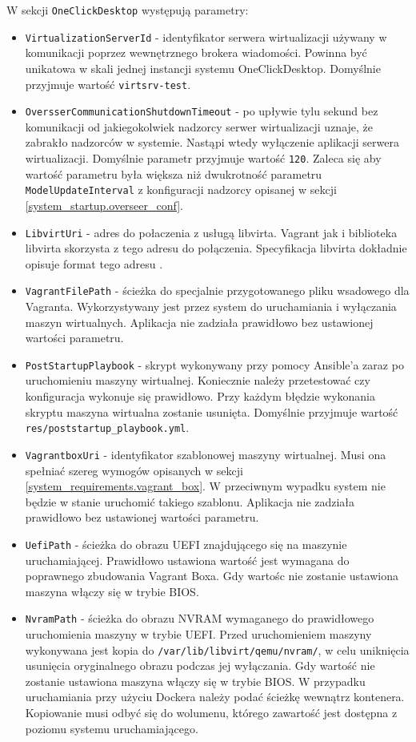 \documentclass[../opis-rozwiazania.tex]{subfiles}
\begin{document}
W sekcji \texttt{OneClickDesktop} występują parametry:
\begin{itemize}
  \item \texttt{VirtualizationServerId} - identyfikator serwera wirtualizacji używany w komunikacji poprzez wewnętrznego brokera wiadomości. Powinna być unikatowa w skali jednej instancji systemu OneClickDesktop. Domyślnie przyjmuje wartość \texttt{virtsrv-test}.
  \item \texttt{OversserCommunicationShutdownTimeout} - po upływie tylu sekund bez komunikacji od jakiegokolwiek nadzorcy serwer wirtualizacji uznaje, że zabrakło nadzorców w systemie. Nastąpi wtedy wyłączenie aplikacji serwera wirtualizacji. Domyślnie parametr przyjmuje wartość \texttt{120}. Zaleca się aby wartość parametru była większa niż dwukrotność parametru \texttt{ModelUpdateInterval} z konfiguracji nadzorcy opisanej w sekcji \ref{system_startup.overseer_conf}.
  \item \texttt{LibvirtUri} - adres do połaczenia z usługą libvirta. Vagrant jak i biblioteka libvirta skorzysta z tego adresu do połączenia. Specyfikacja libvirta dokładnie opisuje format tego adresu \parencite{libvirt-uri}.
  \item \texttt{VagrantFilePath} - ścieżka do specjalnie przygotowanego pliku wsadowego dla Vagranta. Wykorzystywany jest przez system do uruchamiania i wyłączania maszyn wirtualnych. Aplikacja nie zadziała prawidłowo bez ustawionej wartości parametru.
  \item \texttt{PostStartupPlaybook} - skrypt wykonywany przy pomocy Ansible'a zaraz po uruchomieniu maszyny wirtualnej. Koniecznie należy przetestować czy konfiguracja wykonuje się prawidłowo. Przy każdym błędzie wykonania skryptu maszyna wirtualna zostanie usunięta. Domyślnie przyjmuje wartość \texttt{res/poststartup\_playbook.yml}.
  \item \texttt{VagrantboxUri} - identyfikator szablonowej maszyny wirtualnej. Musi ona spełniać szereg wymogów opisanych w sekcji \ref{system_requirements.vagrant_box}. W przeciwnym wypadku system nie będzie w stanie uruchomić takiego szablonu. Aplikacja nie zadziała prawidłowo bez ustawionej wartości parametru.
  \item \texttt{UefiPath} - ścieżka do obrazu UEFI znajdującego się na maszynie uruchamiającej. Prawidłowo ustawiona wartość jest wymagana do poprawnego zbudowania Vagrant Boxa. Gdy wartośc nie zostanie ustawiona maszyna włączy się w trybie BIOS.
  \item \texttt{NvramPath} - ścieżka do obrazu NVRAM wymaganego do prawidłowego uruchomienia maszyny w trybie UEFI. Przed uruchomieniem maszyny wykonywana jest kopia do \texttt{/var/lib/libvirt/qemu/nvram/}, w celu uniknięcia usunięcia oryginalnego obrazu podczas jej wyłączania. Gdy wartość nie zostanie ustawiona maszyna włączy się w trybie BIOS. W przypadku uruchamiania przy użyciu Dockera należy podać ścieżkę wewnątrz kontenera. Kopiowanie musi odbyć się do wolumenu, którego zawartość jest dostępna z poziomu systemu uruchamiającego.

\end{itemize}
\end{document}
